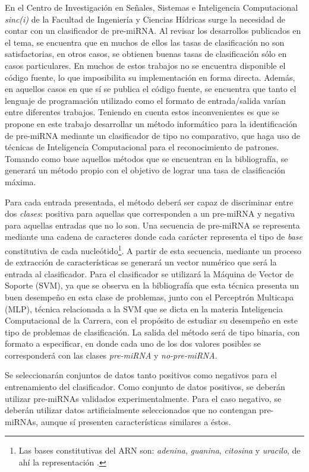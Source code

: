 \documentclass[12pt,bibliography=oldstyle,DIV=14,parskip=full-,titlepage]{scrartcl}
\begin{document}
En el Centro de Investigación en Señales, Sistemas e Inteligencia
Computacional \emph{sinc(i)} de la Facultad de Ingeniería y Ciencias
Hídricas surge la necesidad de contar con un clasificador de
pre-miRNA. Al revisar los desarrollos publicados en el tema, se
encuentra que en muchos de ellos las tasas de clasificación no son
satisfactorias, en otros casos, se obtienen buenas tasas de
clasificación sólo en casos particulares.  En muchos de estos trabajos
no se encuentra disponible el código fuente, lo que imposibilita su
implementación en forma directa.  Además, en aquellos casos en que sí
se publica el código fuente, se encuentra que tanto el lenguaje de
programación utilizado como el formato de entrada/salida varían entre
diferentes trabajos.  Teniendo en cuenta estos inconvenientes es que
se propone en este trabajo desarrollar un método informático para la
identificación de pre-miRNA mediante un clasificador de tipo
no comparativo, que haga uso de técnicas de Inteligencia Computacional
para el reconocimiento de patrones.  Tomando como base aquellos
métodos que se encuentran en la bibliografía, se generará un método
propio con el objetivo de lograr una tasa de clasificación máxima.

Para cada entrada presentada, el método deberá ser capaz de
discriminar entre dos \emph{clases}: positiva para aquellas que
corresponden a un pre-miRNA y negativa para aquellas entradas que no
lo son.  Una secuencia de pre-miRNA se representa mediante una cadena
de caracteres  donde cada carácter representa el
tipo de \emph{base} constitutiva de cada nucleótido\footnote{Las bases
  constitutivas del ARN son: \emph{adenina}, \emph{guanina},
  \emph{citosina} y \emph{uracilo}, de ahí la representación .}.  A partir de esta secuencia, mediante un proceso de
extracción de características se generará un vector numérico que será
la entrada al clasificador.  Para el clasificador se utilizará la
Máquina de Vector de Soporte (SVM), ya que se observa en la
bibliografía que esta técnica presenta un buen desempeño en esta clase
de problemas, junto con el Perceptrón Multicapa (MLP), técnica
relacionada a la SVM \cite{collobert} que se dicta en la materia
Inteligencia Computacional de la Carrera, con el propósito de estudiar
su desempeño en este tipo de problemas de clasificación.  La salida
del método será de tipo binaria, con formato a especificar, en donde
cada uno de los dos valores posibles se corresponderá con las clases
\emph{pre-miRNA} y \emph{no-pre-miRNA}.

Se seleccionarán conjuntos de datos tanto positivos como negativos
para el entrenamiento del clasificador. Como conjunto de datos
positivos, se deberán utilizar pre-miRNAs validados experimentalmente.
Para el caso negativo, se deberán utilizar datos artificialmente
seleccionados que no contengan pre-miRNAs, aunque sí presenten
características similares a éstos.
\end{document}
